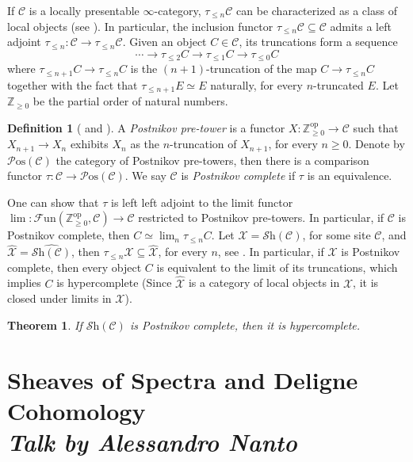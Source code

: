 \documentclass[a4paper]{book}
\newcommand{\lC}{\mathcal{C}}
\newcommand{\lF}{\mathcal{F}}
\newcommand{\lP}{\mathcal{P}}
\newcommand{\lS}{\mathcal{S}}
\newcommand{\lX}{\mathcal{X}}
\newcommand{\bZ}{\mathbb{Z}}
\newcommand{\op}{\mathrm{op}}
\newcommand{\Fun}{\lF\mathrm{un}} %
\newcommand{\Shv}{\lS\mathrm{h}} %
\newcommand{\pos}{\lP\mathrm{os}}
\newtheorem{theorem}[equation]{Theorem}
\theoremstyle{definition}
\newtheorem{definition}[equation]{Definition}
\theoremstyle{remark}
\numberwithin{equation}{section}
\begin{document}
If $\lC$ is a locally presentable $\infty$-category, $\tau_{\leq n}\lC$ can be characterized as a class of local objects (see \cite[Proposition 5.5.6.18]{lurie2009htt}). In particular, the inclusion functor $\tau_{\leq n}\lC\subseteq\lC$ admits a left adjoint $\tau_{\leq n}:\lC\to\tau_{\leq n}\lC$. Given an object $C\in\lC$, its truncations form a sequence 
\begin{equation}
	\cdots\to\tau_{\leq2}C\to\tau_{\leq1}C\to\tau_{\leq0}C
\end{equation}
where $\tau_{\leq n+1}C\to\tau_{\leq n}C$ is the $(n+1)$-truncation of the map $C\to\tau_{\leq n}C$ together with the fact that $\tau_{\leq n+1}E\simeq E$ naturally, for every $n$-truncated $E$. Let $\bZ_{\geq0}$ be the partial order of natural numbers. 
\begin{definition}[{\cite[Definition A.7.2.1]{lurie2018sag} and \cite[Definition 5.5.6.23]{lurie2009htt}}]
	A \emph{Postnikov pre-tower} is a functor $X:\bZ_{\geq0}^{\op}\to\lC$ such that $X_{n+1}\to X_n$ exhibits $X_n$ as the $n$-truncation of $X_{n+1}$, for every $n\geq0$. Denote by $\pos(\lC)$ the category of Postnikov pre-towers, then there is a comparison functor $\tau:\lC\to\pos(\lC)$. We say $\lC$ is \emph{Postnikov complete} if $\tau$ is an equivalence. 
\end{definition}One can show that $\tau$ is left left adjoint to the limit functor $\lim:\Fun(\bZ_{\geq0}^\mathrm{op},\lC)\to\lC$ restricted to Postnikov pre-towers. In particular, if $\lC$ is Postnikov complete, then $C\simeq\lim_n\tau_{\leq n}C$. Let $\lX=\Shv(\lC)$, for some site $\lC$, and $\widehat{\lX}=\widehat{\Shv(\lC)}$, then $\tau_{\leq n}\lX\subseteq\widehat{\lX}$, for every $n$, see \cite[Lemma 6.5.2.9]{lurie2009htt}. In particular, if $\lX$ is Postnikov complete, then every object $C$ is equivalent to the limit of its truncations, which implies $C$ is hypercomplete (Since $\widehat{\lX}$ is a category of local objects in $\lX$, it is closed under limits in $\lX$).
\begin{theorem}
	If $\Shv(\lC)$ is Postnikov complete, then it is hypercomplete. 
\end{theorem} 

\chapter{Sheaves of Spectra and Deligne Cohomology \texorpdfstring{\\}{ } \normalsize \emph{Talk by Alessandro Nanto}}
\end{document}
